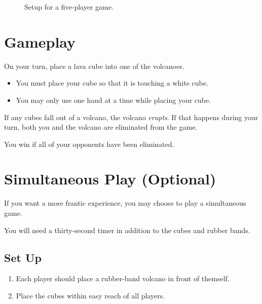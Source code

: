 \documentclass[parskip=half]{scrartcl}
\begin{document}
\vfill

\begin{figure}[hb]
\centering
\caption*{{\scriptsize Setup for a five-player game.}}
\end{figure}
\newpage
\section*{Gameplay}
On your turn, place a lava cube into one of the volcanoes.
\begin{itemize}[leftmargin=*]
\item You must place your cube so that it is touching a white cube.
\item You may only use one hand at a time while placing your cube.
\end{itemize}

If any cubes fall out of a volcano, the volcano \emph{erupts}. If that happens during your turn, both you and the volcano are eliminated from the game.

You win if all of your opponents have been eliminated.

\newpage

\section*{Simultaneous Play (Optional)}
If you want a more frantic experience, you may choose to play a simultaneous game.

You will need a thirty-second timer in addition to the cubes and rubber bands.

\subsection*{Set Up}
\begin{enumerate}[leftmargin=*]
\item Each player should place a rubber-band volcano in front of themself.
\item Place the cubes within easy reach of all players.
\end{enumerate}
\end{document}
